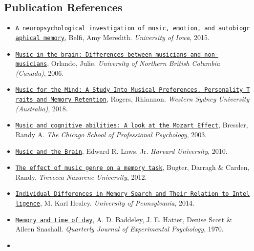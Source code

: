 \documentclass[]{article}
\providecommand{\tightlist}{%
  \setlength{\itemsep}{0pt}\setlength{\parskip}{0pt}}
\begin{document}
\subsection{Publication References}\label{publication-references}

\begin{itemize}
\tightlist
\item
  \href{https://search.proquest.com/docview/1701283142?pq-origsite=summon\&accountid=14512}{\texttt{A\ neuropsychological\ investigation\ of\ music,\ emotion,\ and\ autobiographical\ memory}},
  Belfi, Amy Meredith. \emph{University of Iowa}, 2015.
\item
  \href{https://search.proquest.com/docview/304910597?pq-origsite=summon\&accountid=14512}{\texttt{Music\ in\ the\ brain:\ Differences\ between\ musicians\ and\ non-musicians}},
  Orlando, Julie. \emph{University of Northern British Columbia
  (Canada)}, 2006.
\item
  \href{https://search.proquest.com/docview/2083960675?accountid=14512}{\texttt{Music\ for\ the\ Mind:\ A\ Study\ Into\ Musical\ Preferences,\ Personality\ Traits\ and\ Memory\ Retention}},
  Rogers, Rhiannon. \emph{Western Sydney University (Australia)}, 2018.
\item
  \href{https://search.proquest.com/docview/305228684?pq-origsite=summon\&accountid=14512}{\texttt{Music\ and\ cognitive\ abilities:\ A\ look\ at\ the\ Mozart\ Effect}},
  Bressler, Randy A. \emph{The Chicago School of Professional
  Psychology}, 2003.
\item
  \href{https://www.sciencedirect.com/science/article/pii/S1878875010001129}{\texttt{Music\ and\ the\ Brain}},
  Edward R. Laws, Jr. \emph{Harvard University}, 2010.
\item
  \href{https://scholar.utc.edu/cgi/viewcontent.cgi?article=1214\&context=mps}{\texttt{The\ effect\ of\ music\ genre\ on\ a\ memory\ task}},
  Bugter, Darragh \& Carden, Randy. \emph{Trevecca Nazarene University},
  2012.
\item
  \href{http://memory.psych.upenn.edu/files/pubs/HealEtal14.pdf}{\texttt{Individual\ Differences\ in\ Memory\ Search\ and\ Their\ Relation\ to\ Intelligence}},
  M. Karl Healey. \emph{University of Pennsylvania}, 2014.
\item
  \href{https://journals.sagepub.com/doi/10.1080/14640747008401939}{\texttt{Memory\ and\ time\ of\ day}},
  A. D. Baddeley, J. E. Hatter, Denise Scott \& Aileen Snashall.
  \emph{Quarterly Journal of Experimental Psychology}, 1970.
\item

\end{itemize}
\end{document}
